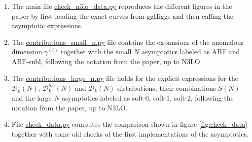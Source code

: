 \documentclass[12pt]{article}
\begin{document}
\begin{enumerate}
	\item The main file \href{https://github.com/N3PDF/crystalball/blob/jesus_gp/asymptotics/check_n3lo_data.py}{{\color{blue}check\_n3lo\_data.py}} reproduces the different figures in the paper by first loading the exact curves from ggHiggs and then calling the asymptotic expressions.
	\item The \href{https://github.com/N3PDF/crystalball/blob/jesus_gp/asymptotics/contributions_small_n.py}{{\color{blue}contributions\_small\_n.py}} file contains the expansions of the anomalous dimension $\gamma^{(i)}$ together with the small $N$ asymptotics labeled as ABF and ABF-subl, following the notation from the paper, up to N3LO.
	\item The \href{https://github.com/N3PDF/crystalball/blob/jesus_gp/asymptotics/contributions_large_n.py}{{\color{blue}contributions\_large\_n.py}} file holds for the explicit expressions for the $\mathcal{D}_{k}(N)$, $\mathcal{D}^{log}_{k}(N)$ and $\hat{\mathcal{D}}_{k}(N)$ distributions, their combinations $S(N)$ and the large $N$ asymptotics labeled as soft-0, soft-1, soft-2, following the notation from the paper, up to N3LO.
	\item File \href{https://github.com/N3PDF/crystalball/blob/jesus_gp/asymptotics/check_data.py}{{\color{blue}check\_data.py}} computes the comparison shown in figure \ref{fig:check_data} together with some old checks of the first implementations of the asymptotics.
\end{enumerate}
\end{document}
